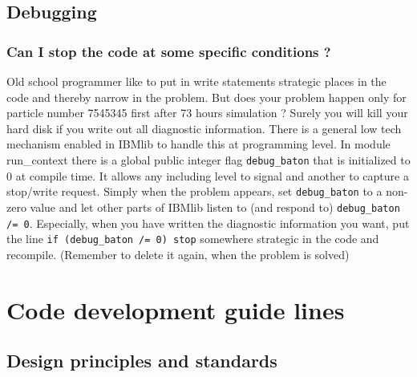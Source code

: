 \section{Debugging}
   \subsection{Can I stop the code at some specific conditions ?}
   Old school programmer like to put in write statements strategic places in the
   code and thereby narrow in the problem. But does your problem happen only for  
   particle number 7545345 first after 73 hours simulation ?
   Surely you will kill your hard disk if you write out all diagnostic
   information. 
   There is a general low tech mechanism enabled in IBMlib to handle this 
   at programming level. In module run\_context there is a global public integer flag 
   {\tt debug\_baton} that is initialized to 0 at compile time. 
   It allows any including level to signal and another to capture a stop/write request.
   Simply when the problem appears, set {\tt debug\_baton} to a non-zero value
   and let other parts of IBMlib listen to (and respond to) {\tt debug\_baton /= 0}.
   Especially, when you have written the diagnostic information you want,
   put the line {\tt if (debug\_baton /= 0) stop} somewhere strategic in the code 
   and recompile. (Remember to delete it again, when the problem is solved)
  
\chapter{Code development guide lines}

\section{Design principles and standards}

